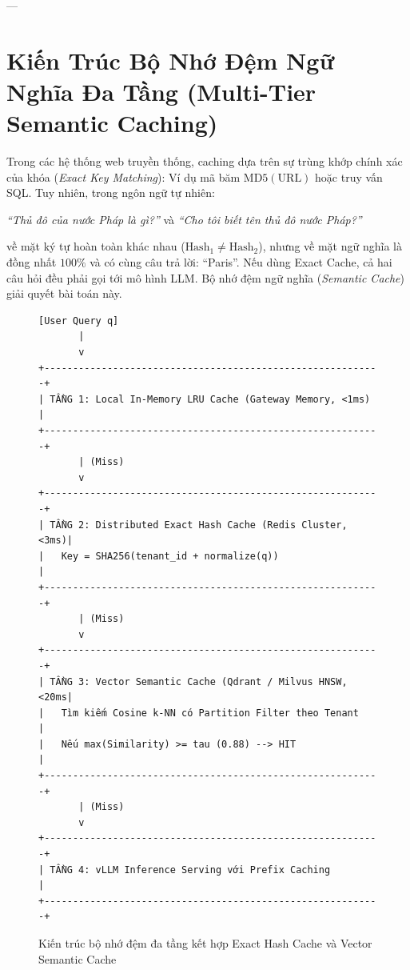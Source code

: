 ---

\section{Kiến Trúc Bộ Nhớ Đệm Ngữ Nghĩa Đa Tầng (Multi-Tier Semantic Caching)}
\label{sec:ch13-semantic-caching}

Trong các hệ thống web truyền thống, caching dựa trên sự trùng khớp chính xác của khóa (\textit{Exact Key Matching}): Ví dụ mã băm $\text{MD5}(\text{URL})$ hoặc truy vấn SQL.
Tuy nhiên, trong ngôn ngữ tự nhiên:
\begin{center}
\textit{``Thủ đô của nước Pháp là gì?''} \quad và \quad \textit{``Cho tôi biết tên thủ đô nước Pháp?''}
\end{center}
về mặt ký tự hoàn toàn khác nhau ($\text{Hash}_1 \neq \text{Hash}_2$), nhưng về mặt ngữ nghĩa là đồng nhất $100\%$ và có cùng câu trả lời: ``Paris''.
Nếu dùng Exact Cache, cả hai câu hỏi đều phải gọi tới mô hình LLM. Bộ nhớ đệm ngữ nghĩa (\textit{Semantic Cache}) giải quyết bài toán này.

\begin{figure}[htbp]
\centering
\small
\begin{verbatim}
[User Query q]
       |
       v
+-----------------------------------------------------------+
| TẦNG 1: Local In-Memory LRU Cache (Gateway Memory, <1ms)  |
+-----------------------------------------------------------+
       | (Miss)
       v
+-----------------------------------------------------------+
| TẦNG 2: Distributed Exact Hash Cache (Redis Cluster, <3ms)|
|   Key = SHA256(tenant_id + normalize(q))                  |
+-----------------------------------------------------------+
       | (Miss)
       v
+-----------------------------------------------------------+
| TẦNG 3: Vector Semantic Cache (Qdrant / Milvus HNSW, <20ms|
|   Tìm kiếm Cosine k-NN có Partition Filter theo Tenant     |
|   Nếu max(Similarity) >= tau (0.88) --> HIT                |
+-----------------------------------------------------------+
       | (Miss)
       v
+-----------------------------------------------------------+
| TẦNG 4: vLLM Inference Serving với Prefix Caching         |
+-----------------------------------------------------------+
\end{verbatim}
\caption{Kiến trúc bộ nhớ đệm đa tầng kết hợp Exact Hash Cache và Vector Semantic Cache}
\label{fig:two-tier-cache}
\end{figure}


